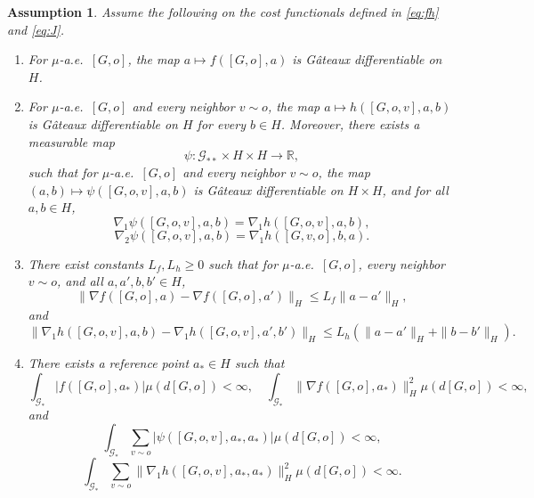 \documentclass[11pt]{article}
\newcommand{\be}{\begin{equation}}
\newcommand{\ee}{\end{equation}}
\newtheorem{assumption}[theorem]{Assumption}
\numberwithin{equation}{section}
\begin{document}
\begin{assumption}\label{ass:potential}
Assume the following on the cost functionals defined in \eqref{eq:fh} and \eqref{eq:J}.
\begin{enumerate}[label=(\roman*)]
\item For \(\mu\)-a.e.~\([G,o]\), the map \(a\mapsto f([G,o],a)\) is G\^ateaux differentiable on \(H\).

\item For \(\mu\)-a.e.~\([G,o]\) and every neighbor $v\sim o$, the map \(a\mapsto h([G,o,v],a,b)\) is G\^ateaux differentiable on \(H\) for every \(b\in H\). Moreover, there exists a measurable map
\be\label{eq:psi}
\psi:\mathcal G_{\ast\ast}\times H\times H\to \mathbb R,
\ee
such that for \(\mu\)-a.e.~\([G,o]\) and every neighbor $v\sim o$, the map \((a,b)\mapsto \psi([G,o,v],a,b)\) is G\^ateaux differentiable on \(H\times H\), and for all \(a,b\in H\),
\begin{equation} \label{eq:potential-id-1}
\nabla_1 \psi([G,o,v],a,b)=\nabla_1 h([G,o,v],a,b),
\end{equation}
\begin{equation} \label{eq:potential-id-2}
\nabla_2 \psi([G,o,v],a,b)=\nabla_1 h([G,v,o],b,a).
\end{equation}

\item There exist constants \(L_f,L_h\ge 0\) such that for \(\mu\)-a.e.~\([G,o]\), every neighbor \(v\sim o\), and all \(a,a',b,b'\in H\),
\begin{equation} \label{eq:lip-f}
\|\nabla f([G,o],a)-\nabla f([G,o],a')\|_H
\le
L_f\|a-a'\|_H,
\end{equation}
and
\begin{equation} \label{eq:lip-h}
\|\nabla_1 h([G,o,v],a,b)-\nabla_1 h([G,o,v],a',b')\|_H
\le
L_h(\|a-a'\|_H+\|b-b'\|_H).
\end{equation}

\item There exists a reference point \(a_\ast\in H\) such that
\begin{equation} \label{eq:int-base-f}
\int_{\mathcal G_\ast} |f([G,o],a_\ast)|\mu(d[G,o])<\infty,
\quad
\int_{\mathcal G_\ast} \|\nabla f([G,o],a_\ast)\|_H^2\mu(d[G,o])<\infty,
\end{equation}
and
\begin{equation} \label{eq:int-base-psi}
\int_{\mathcal G_\ast}\sum_{v\sim o} |\psi([G,o,v],a_\ast,a_\ast)|\mu(d[G,o])<\infty,
\end{equation}
\begin{equation} \label{eq:int-base-h}
\int_{\mathcal G_\ast}\sum_{v\sim o} \|\nabla_1 h([G,o,v],a_\ast,a_\ast)\|_H^2\mu(d[G,o])<\infty.
\end{equation}
\end{enumerate}
\end{assumption}
\end{document}
